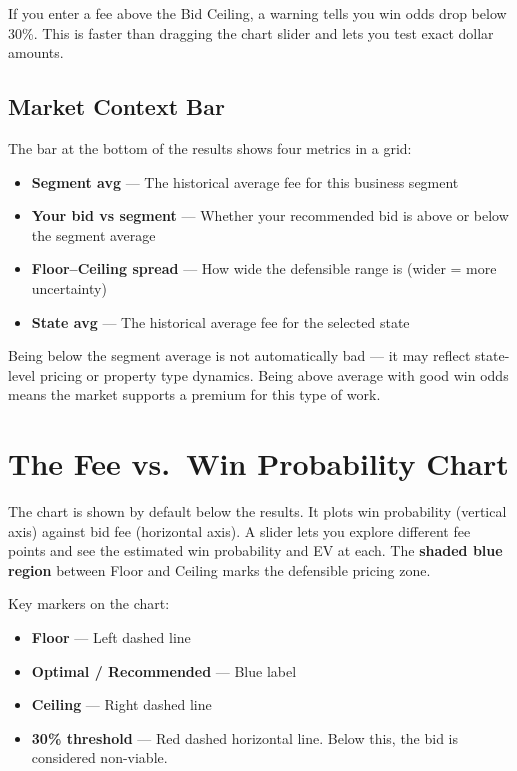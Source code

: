\documentclass[12pt,a4paper]{article}
\begin{document}
If you enter a fee above the Bid Ceiling, a warning tells you win odds drop below 30\%.
This is faster than dragging the chart slider and lets you test exact dollar amounts.

\subsection{Market Context Bar}

The bar at the bottom of the results shows four metrics in a grid:

\begin{itemize}[leftmargin=2em]
    \item \textbf{Segment avg} --- The historical average fee for this business segment
    \item \textbf{Your bid vs segment} --- Whether your recommended bid is above or
          below the segment average
    \item \textbf{Floor--Ceiling spread} --- How wide the defensible range is
          (wider = more uncertainty)
    \item \textbf{State avg} --- The historical average fee for the selected state
\end{itemize}

Being below the segment average is not automatically bad --- it may reflect state-level
pricing or property type dynamics. Being above average with good win odds means the
market supports a premium for this type of work.

\section{The Fee vs.\ Win Probability Chart}

The chart is shown by default below the results. It plots win probability (vertical
axis) against bid fee (horizontal axis). A slider lets you explore different fee points
and see the estimated win probability and EV at each. The \textbf{shaded blue region}
between Floor and Ceiling marks the defensible pricing zone.

Key markers on the chart:
\begin{itemize}[leftmargin=2em]
    \item \textbf{Floor} --- Left dashed line
    \item \textbf{Optimal / Recommended} --- Blue label
    \item \textbf{Ceiling} --- Right dashed line
    \item \textbf{30\% threshold} --- Red dashed horizontal line. Below this, the bid
          is considered non-viable.
\end{itemize}
\end{document}
